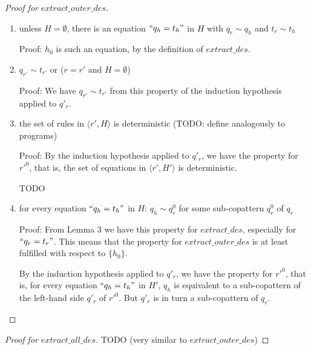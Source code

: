 \documentclass[11pt]{article} %
\begin{document}
\begin{proof}[Proof for $extract\_outer\_des$]
\begin{itemize}
\begin{enumerate}
\item unless $H = \emptyset$, there is an equation $`` q_h = t_h "$ in $H$ with $q_r \sim q_h$ and $t_r \sim t_h$

Proof: $h_0$ is such an equation, by the definition of $extract\_des$.

\item $q_{r'} \sim t_{r'}$ or ($r = r'$ and $H = \emptyset$)

Proof: We have $q_{r'} \sim t_{r'}$ from this property of the induction hypothesis applied to $q'_r$.

\item the set of rules in $\big\langle r', H \big\rangle$ is deterministic (TODO: define analogously to programs)

Proof: By the induction hypothesis applied to $q'_r$, we have the property for $r'^0$, that is, the set of equations in $\big\langle r', H' \big\rangle$ is deterministic.

TODO

\item for every equation $`` q_h = t_h "$ in $H$: $q_h \sim q^0_r$ for some sub-copattern $q^0_r$ of $q_r$

Proof: From Lemma 3 we have this property for $extract\_des$, especially for $`` q_r = t_r "$. This means that the property for $extract\_outer\_des$ is at least fulfilled with respect to $\{h_0\}$.

By the induction hypothesis applied to $q'_r$, we have the property for $r'^0$, that is, for every equation $`` q_h = t_h "$ in $H'$, $q_h$ is equivalent to a sub-copattern of the left-hand side $q'_r$ of $r'^0$. But $q'_r$ is in turn a sub-copattern of $q_r$.

\end{enumerate}

\end{itemize}

\end{proof}

\begin{proof}[Proof for $extract\_all\_des$]

TODO (very similar to $extract\_outer\_des$)

\end{proof}
\end{document}
